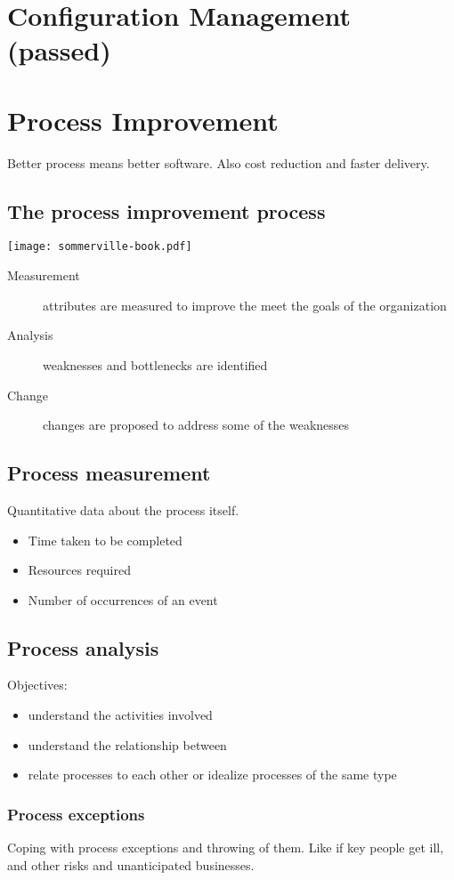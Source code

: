 \documentclass[a4paper,11pt,twocolumn]{report}
\begin{document}
    \chapter{Configuration Management (passed)}

    \chapter{Process Improvement}
    Better process means better software. Also cost reduction and faster
    delivery.
    \section{The process improvement process}
    \texttt{[image: sommerville-book.pdf]}
    \begin{description}
        \item[Measurement] attributes are measured to improve the meet the
            goals of the organization
        \item[Analysis] weaknesses and bottlenecks are identified
        \item[Change] changes are proposed to address some of the weaknesses
    \end{description}
    \section{Process measurement}
    Quantitative data about the process itself.
    \begin{itemize}
        \item Time taken to be completed
        \item Resources required
        \item Number of occurrences of an event
    \end{itemize}
    \section{Process analysis}
    Objectives:
    \begin{itemize}
        \item understand the activities involved
        \item understand the relationship between
        \item relate processes to each other or idealize processes of the same
            type
    \end{itemize}
    \subsection{Process exceptions}
    Coping with process exceptions and throwing of them. Like if key people get
    ill, and other risks and unanticipated businesses.
\end{document}

